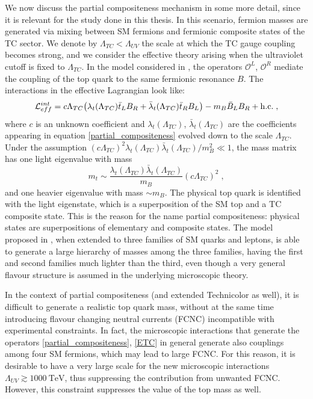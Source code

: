We now discuss the partial compositeness mechanism in some more detail, since it is relevant for the study done in this thesis. In this scenario, fermion masses are generated via mixing between SM fermions and fermionic composite states of the TC sector. We denote by $\Lambda_{TC} < \Lambda_{UV} $ the scale at which the TC gauge coupling becomes strong, and we consider the effective theory arising when the ultraviolet cutoff is fixed to $\Lambda_{TC}$. In the model considered in \cite{Kaplan:1991dc}, the operators $\mathcal O^L$, $\mathcal O^R$ mediate the coupling of the top quark to the same fermionic resonance $B$. The interactions in the effective Lagrangian look like:
\begin{equation}
\mathcal L_{eff}^{int} = c \Lambda_{TC}  \bigl( \lambda_t(\Lambda_{TC}) \bar t_L B_R + \bar \lambda_t(\Lambda_{TC}) \bar t_R B_L \bigr) - m_B \bar B_L B_R + \mathrm{h.c.} \; ,
\end{equation}
%
where $c$ is an unknown coefficient and $\lambda_t(\Lambda_{TC})$, $\bar \lambda_t(\Lambda_{TC})$ are the coefficients appearing in equation \ref{partial_compositeness} evolved down to the scale $\Lambda_{TC}$. Under the assumption $(c \Lambda_ {TC})^2  \lambda_t(\Lambda_{TC}) \bar \lambda_t(\Lambda_{TC})/m_B^2 \ll 1$, the mass matrix has one light eigenvalue with mass
\begin{equation}
m_t \sim \frac{\lambda_t(\Lambda_{TC}) \bar \lambda_t(\Lambda_{TC})}{m_B} (c \Lambda_{TC})^2 \; ,
\end{equation}
%
and one heavier eigenvalue with mass $\sim m_B$. The physical top quark is identified with the light eigenstate, which is a superposition of the SM top and a TC composite state. This is the reason for the name partial compositeness: physical states are superpositions of elementary and composite states. The model proposed in \cite{Kaplan:1991dc}, when extended to three families of SM quarks and leptons, is able to generate a large hierarchy of masses among the three families, having the first and second families much lighter than the third, even though a very general flavour structure is assumed in the underlying microscopic theory.

In the context of partial compositeness (and extended Technicolor as well), it is difficult to generate a realistic top quark mass, without at the same time introducing flavour changing neutral currents (FCNC) incompatible with experimental constraints. In fact, the microscopic interactions that generate the operators \ref{partial_compositeness}, \ref{ETC}  in general generate also couplings among four SM fermions, which may lead to large FCNC. For this reason, it is desirable to have a very large scale for the new microscopic interactions $\Lambda_{UV}  \gtrsim 1000 \: \mathrm{TeV}$, thus suppressing the contribution from unwanted FCNC. However, this constraint suppresses the value of the top mass as well. 

